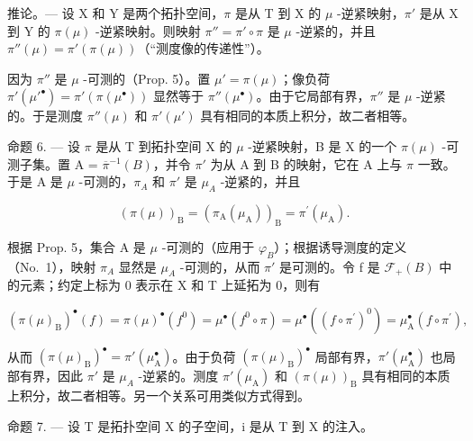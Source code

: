 推论。--- 设 X 和 Y 是两个拓扑空间，\(\pi\) 是从 T 到 X 的 \(\mu\) -逆紧映射，\(\pi'\) 是从 X 到 Y 的 \(\pi(\mu)\) -逆紧映射。则映射 \(\pi'' = \pi' \circ \pi\) 是 \(\mu\) -逆紧的，并且 \(\pi''(\mu) = \pi'(\pi(\mu))\)（“测度像的传递性”）。

因为 \(\pi''\) 是 \(\mu\) -可测的（Prop. 5）。置 \(\mu' = \pi(\mu)\)；像负荷 \(\pi'(\mu'^{\bullet}) = \pi'(\pi(\mu^{\bullet}))\) 显然等于 \(\pi''(\mu^{\bullet})\)。由于它局部有界，\(\pi''\) 是 \(\mu\) -逆紧的。于是测度 \(\pi''(\mu)\) 和 \(\pi'(\mu')\) 具有相同的本质上积分，故二者相等。

命题 6. --- 设 \(\pi\) 是从 T 到拓扑空间 X 的 \(\mu\) -逆紧映射，B 是 X 的一个 \(\pi(\mu)\) -可测子集。置 A = \(\overline{\pi}^{-1}(B)\)，并令 \(\pi'\) 为从 A 到 B 的映射，它在 A 上与 \(\pi\) 一致。于是 A 是 \(\mu\) -可测的，\(\pi_A\) 和 \(\pi'\) 是 \(\mu_A\) -逆紧的，并且

\[
\left(\pi (\mu)\right) _ {\mathrm{B}} = \left(\pi_ {\mathrm{A}} (\mu_ {\mathrm{A}})\right) _ {\mathrm{B}} = \pi^ {\prime} (\mu_ {\mathrm{A}}).\tag{2}
\]

根据 Prop. 5，集合 A 是 \(\mu\) -可测的（应用于 \(\varphi_{B}\)）；根据诱导测度的定义（No.~1），映射 \(\pi_{A}\) 显然是 \(\mu_{A}\) -可测的，从而 \(\pi'\) 是可测的。令 f 是 \(\mathcal{F}_{+}(B)\) 中的元素；约定上标为 0 表示在 X 和 T 上延拓为 0，则有

\[
\left(\pi (\mu) _ {\mathrm{B}}\right) ^ {\bullet} (f) = \pi (\mu) ^ {\bullet} \left(f ^ {0}\right) = \mu^ {\bullet} \left(f ^ {0} \circ \pi\right) = \mu^ {\bullet} \left(\left(f \circ \pi^ {\prime}\right) ^ {0}\right) = \mu_ {\mathrm{A}} ^ {\bullet} \left(f \circ \pi^ {\prime}\right),
\]

从而 \(\left(\pi(\mu)_{\mathrm{B}}\right)^{\bullet} = \pi'(\mu_{\mathrm{A}}^{\bullet})\)。由于负荷 \(\left(\pi(\mu)_{\mathrm{B}}\right)^{\bullet}\) 局部有界，\(\pi'(\mu_{\mathrm{A}}^{\bullet})\) 也局部有界，因此 \(\pi'\) 是 \(\mu_{A}\) -逆紧的。测度 \(\pi'(\mu_{\mathrm{A}})\) 和 \(\left(\pi(\mu)\right)_{\mathrm{B}}\) 具有相同的本质上积分，故二者相等。另一个关系可用类似方式得到。

命题 7. --- 设 T 是拓扑空间 X 的子空间，i 是从 T 到 X 的注入。

